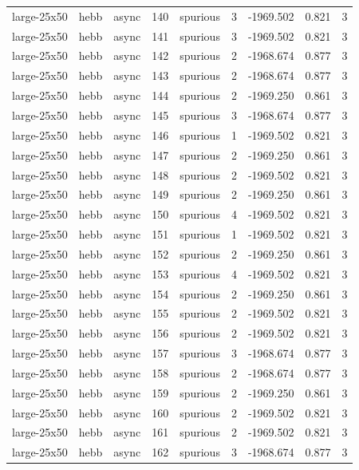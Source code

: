 \begin{tabular}{lllrlrrrr}
large-25x50 & hebb & async & 140 & spurious & 3 & -1969.502 & 0.821 & 3 \\
large-25x50 & hebb & async & 141 & spurious & 3 & -1969.502 & 0.821 & 3 \\
large-25x50 & hebb & async & 142 & spurious & 2 & -1968.674 & 0.877 & 3 \\
large-25x50 & hebb & async & 143 & spurious & 2 & -1968.674 & 0.877 & 3 \\
large-25x50 & hebb & async & 144 & spurious & 2 & -1969.250 & 0.861 & 3 \\
large-25x50 & hebb & async & 145 & spurious & 3 & -1968.674 & 0.877 & 3 \\
large-25x50 & hebb & async & 146 & spurious & 1 & -1969.502 & 0.821 & 3 \\
large-25x50 & hebb & async & 147 & spurious & 2 & -1969.250 & 0.861 & 3 \\
large-25x50 & hebb & async & 148 & spurious & 2 & -1969.502 & 0.821 & 3 \\
large-25x50 & hebb & async & 149 & spurious & 2 & -1969.250 & 0.861 & 3 \\
large-25x50 & hebb & async & 150 & spurious & 4 & -1969.502 & 0.821 & 3 \\
large-25x50 & hebb & async & 151 & spurious & 1 & -1969.502 & 0.821 & 3 \\
large-25x50 & hebb & async & 152 & spurious & 2 & -1969.250 & 0.861 & 3 \\
large-25x50 & hebb & async & 153 & spurious & 4 & -1969.502 & 0.821 & 3 \\
large-25x50 & hebb & async & 154 & spurious & 2 & -1969.250 & 0.861 & 3 \\
large-25x50 & hebb & async & 155 & spurious & 2 & -1969.502 & 0.821 & 3 \\
large-25x50 & hebb & async & 156 & spurious & 2 & -1969.502 & 0.821 & 3 \\
large-25x50 & hebb & async & 157 & spurious & 3 & -1968.674 & 0.877 & 3 \\
large-25x50 & hebb & async & 158 & spurious & 2 & -1968.674 & 0.877 & 3 \\
large-25x50 & hebb & async & 159 & spurious & 2 & -1969.250 & 0.861 & 3 \\
large-25x50 & hebb & async & 160 & spurious & 2 & -1969.502 & 0.821 & 3 \\
large-25x50 & hebb & async & 161 & spurious & 2 & -1969.502 & 0.821 & 3 \\
large-25x50 & hebb & async & 162 & spurious & 3 & -1968.674 & 0.877 & 3 \\

\end{tabular}
